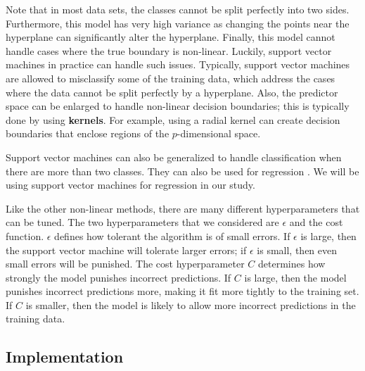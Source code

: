 \documentclass{article}
\begin{document}
Note that in most data sets, the classes cannot be split perfectly into two sides. Furthermore, this model has very high variance as changing the points near the hyperplane can significantly alter the hyperplane. Finally, this model cannot handle cases where the true boundary is non-linear. Luckily, support vector machines in practice can handle such issues. Typically, support vector machines are allowed to misclassify some of the training data, which address the cases where the data cannot be split perfectly by a hyperplane. Also, the predictor space can be enlarged to handle non-linear decision boundaries; this is typically done by using \textbf{kernels}. For example, using a radial kernel can create decision boundaries that enclose regions of the $p$-dimensional space.

Support vector machines can also be generalized to handle classification when there are more than two classes. They can also be used for regression \cite{drucker1997support}. We will be using support vector machines for regression in our study.

Like the other non-linear methods, there are many different hyperparameters that can be tuned. The two hyperparameters that we considered are $\epsilon$ and the cost function. $\epsilon$ defines how tolerant the algorithm is of small errors. If $\epsilon$ is large, then the support vector machine will tolerate larger errors; if $\epsilon$ is small, then even small errors will be punished. The cost hyperparameter $C$ determines how strongly the model punishes incorrect predictions. If $C$ is large, then the model punishes incorrect predictions more, making it fit more tightly to the training set. If $C$ is smaller, then the model is likely to allow more incorrect predictions in the training data.


\subsection{Implementation}
\end{document}

